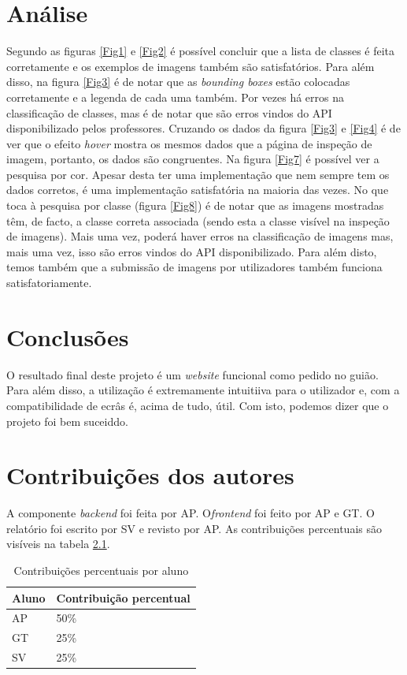 \documentclass{report}
\begin{document}
\chapter{Análise}
\label{chap.analise}
Segundo as figuras \ref{Fig1} e \ref{Fig2} é possível concluir que a lista de classes é feita corretamente e os exemplos de imagens também são satisfatórios.
Para além disso, na figura \ref{Fig3} é de notar que as \textit{bounding boxes} estão colocadas corretamente e a legenda de cada uma também. Por vezes há erros na classificação de classes, mas é de notar que são erros vindos do API disponibilizado pelos professores.
Cruzando os dados da figura \ref{Fig3} e \ref{Fig4} é de ver que o efeito \textit{hover} mostra os mesmos dados que a página de inspeção de imagem, portanto, os dados são congruentes.
Na figura \ref{Fig7} é possível ver a pesquisa por cor. Apesar desta ter uma implementação que nem sempre tem os dados corretos, é uma implementação satisfatória na maioria das vezes.
No que toca à pesquisa por classe (figura \ref{Fig8}) é de notar que as imagens mostradas têm, de facto, a classe correta associada  (sendo esta a classe visível na inspeção de imagens). Mais uma vez, poderá haver erros na classificação de imagens mas, mais uma vez, isso são erros vindos do API disponibilizado.
Para além disto, temos também que a submissão de imagens por utilizadores também funciona satisfatoriamente. 


\chapter{Conclusões}
\label{chap.conclusao}
O resultado final deste projeto é um \textit{website} funcional como pedido no guião. Para além disso, a utilização é extremamente intuitiiva para o utilizador e, com a compatibilidade de ecrâs é, acima de tudo, útil. Com isto, podemos dizer que o projeto foi bem suceiddo.

\chapter*{Contribuições dos autores}
A componente \textit{backend} foi feita por \ac{AP}. O\textit{frontend} foi feito por \ac{AP} e \ac{GT}. O relatório foi escrito por \ac{SV} e revisto por \ac{AP}.
As contribuições percentuais são visíveis na tabela \ref{tab2}.
\begin{table}[h!]
\begin{center}
\caption{Contribuições percentuais por aluno}
\begin{tabular}{l|l}
\hline
\multicolumn{1}{|l|}{Aluno} & \multicolumn{1}{l|}{Contribuição percentual} \\ \hline
            \ac{AP}   & 50\%                               \\ 
            \ac{GT}     & 25\%                               \\
            \ac{SV}         & 25\%                                
\end{tabular}
\label{tab2}
\end{center}
\end{table}
\end{document}
